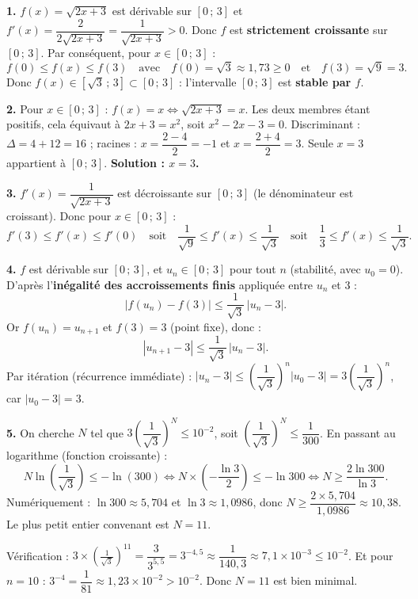 \documentclass[11pt]{article}
\begin{document}
\begin{corrige}
\textbf{1.} $f(x) = \sqrt{2x+3}$ est dérivable sur $[0\,;\,3]$ et $f'(x) = \dfrac{2}{2\sqrt{2x+3}} = \dfrac{1}{\sqrt{2x+3}} > 0$. Donc $f$ est \textbf{strictement croissante} sur $[0\,;\,3]$. Par conséquent, pour $x \in [0\,;\,3]$ :
\[ f(0) \leq f(x) \leq f(3) \quad\text{avec}\quad f(0) = \sqrt{3} \approx 1{,}73 \geq 0 \quad\text{et}\quad f(3) = \sqrt{9} = 3. \]
Donc $f(x) \in [\sqrt{3}\,;\,3] \subset [0\,;\,3]$ : l'intervalle $[0\,;\,3]$ est \textbf{stable par $f$}.

\textbf{2.} Pour $x \in [0\,;\,3]$ : $f(x) = x \iff \sqrt{2x+3} = x$. Les deux membres étant positifs, cela équivaut à $2x + 3 = x^2$, soit $x^2 - 2x - 3 = 0$. Discriminant : $\Delta = 4 + 12 = 16$ ; racines : $x = \dfrac{2 - 4}{2} = -1$ et $x = \dfrac{2+4}{2} = 3$. Seule $x = 3$ appartient à $[0\,;\,3]$. \textbf{Solution : $x = 3$.}

\textbf{3.} $f'(x) = \dfrac{1}{\sqrt{2x+3}}$ est décroissante sur $[0\,;\,3]$ (le dénominateur est croissant). Donc pour $x \in [0\,;\,3]$ :
\[ f'(3) \leq f'(x) \leq f'(0) \quad\text{soit}\quad \frac{1}{\sqrt{9}} \leq f'(x) \leq \frac{1}{\sqrt{3}} \quad\text{soit}\quad \frac{1}{3} \leq f'(x) \leq \frac{1}{\sqrt{3}}. \]

\textbf{4.} $f$ est dérivable sur $[0\,;\,3]$, et $u_n \in [0\,;\,3]$ pour tout $n$ (stabilité, avec $u_0 = 0$). D'après l'\textbf{inégalité des accroissements finis} appliquée entre $u_n$ et $3$ :
\[ |f(u_n) - f(3)| \leq \frac{1}{\sqrt{3}}\,|u_n - 3|. \]
Or $f(u_n) = u_{n+1}$ et $f(3) = 3$ (point fixe), donc :
\[ |u_{n+1} - 3| \leq \frac{1}{\sqrt{3}}\,|u_n - 3|. \]
Par itération (récurrence immédiate) : $|u_n - 3| \leq \left(\dfrac{1}{\sqrt{3}}\right)^n |u_0 - 3| = 3\left(\dfrac{1}{\sqrt{3}}\right)^n$, car $|u_0 - 3| = 3$.

\textbf{5.} On cherche $N$ tel que $3\left(\dfrac{1}{\sqrt{3}}\right)^N \leq 10^{-2}$, soit $\left(\dfrac{1}{\sqrt{3}}\right)^N \leq \dfrac{1}{300}$. En passant au logarithme (fonction croissante) :
\[ N \ln\left(\frac{1}{\sqrt{3}}\right) \leq -\ln(300) \iff N \times \left(-\frac{\ln 3}{2}\right) \leq -\ln 300 \iff N \geq \frac{2\ln 300}{\ln 3}. \]
Numériquement : $\ln 300 \approx 5{,}704$ et $\ln 3 \approx 1{,}0986$, donc $N \geq \dfrac{2 \times 5{,}704}{1{,}0986} \approx 10{,}38$. Le plus petit entier convenant est $\boxed{N = 11}$.

Vérification : $3 \times \left(\frac{1}{\sqrt{3}}\right)^{11} = \dfrac{3}{3^{5{,}5}} = 3^{-4{,}5} \approx \dfrac{1}{140{,}3} \approx 7{,}1 \times 10^{-3} \leq 10^{-2}$. Et pour $n = 10$ : $3^{-4} = \dfrac{1}{81} \approx 1{,}23 \times 10^{-2} > 10^{-2}$. Donc $N = 11$ est bien minimal.
\end{corrige}
\end{document}
